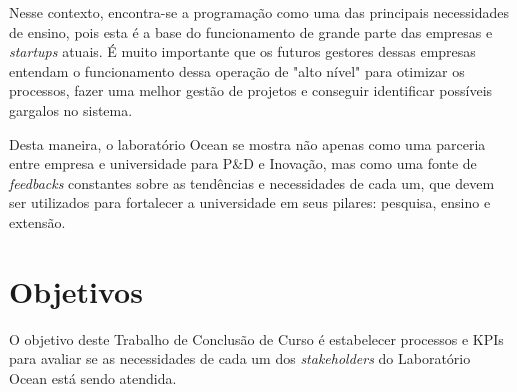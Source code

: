 Nesse contexto, encontra-se a programação como uma das principais necessidades de ensino, pois esta é a base do funcionamento de grande parte das empresas e \textit{startups} atuais. É muito importante que os futuros gestores dessas empresas entendam o funcionamento dessa operação de "alto nível" para otimizar os processos, fazer uma melhor gestão de projetos e conseguir identificar possíveis gargalos no sistema.

Desta maneira, o laboratório Ocean se mostra não apenas como uma parceria entre empresa e universidade para P\&D e Inovação, mas como uma fonte de \textit{feedbacks} constantes sobre as tendências e necessidades de cada um, que devem ser utilizados para fortalecer a universidade em seus pilares: pesquisa, ensino e extensão.

\section[Objetivos]{Objetivos}
\label{chap:objetivos}

O objetivo deste Trabalho de Conclusão de Curso é estabelecer processos e KPIs para avaliar se as necessidades de cada um dos \textit{stakeholders} do Laboratório Ocean está sendo atendida.